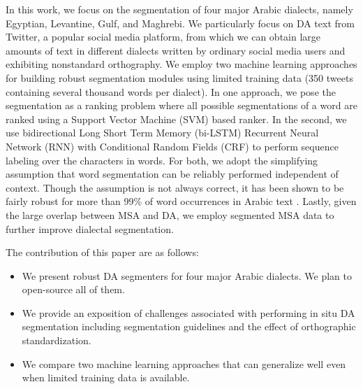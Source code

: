\documentclass[11pt,letterpaper]{article}
\begin{document}
In this work, we focus on the segmentation of four major Arabic dialects, namely Egyptian, Levantine, Gulf, and Maghrebi.  We particularly focus on DA text from Twitter, a popular social media platform, from which we can obtain large amounts of text in different dialects written by ordinary social media users and exhibiting nonstandard orthography. We employ two machine learning approaches for building robust segmentation modules using limited training data (350 tweets containing several thousand words per dialect).  In one approach, we pose the segmentation as a ranking problem where all possible segmentations of a word are ranked using a Support Vector Machine (SVM) based ranker. In the second, we use bidirectional Long Short Term Memory (bi-LSTM) Recurrent Neural Network (RNN) with Conditional Random Fields (CRF) to perform sequence labeling over the characters in words.  For both, we adopt the simplifying assumption that word segmentation can be reliably performed independent of context.  Though the assumption is not always correct, it has been shown to be fairly robust for more than 99\% of word occurrences in Arabic text \cite{abdelali2016farasa}.  Lastly, given the large overlap between MSA and DA, we employ segmented MSA data to further improve dialectal segmentation.

The contribution of this paper are as follows:
\begin{itemize}[leftmargin=*]
\setlength\itemsep{-0.3em}
\item We present robust DA segmenters for four major Arabic dialects.  We plan to open-source all of them.
\item We provide an exposition of challenges associated with performing in situ DA segmentation including segmentation guidelines and the effect of orthographic standardization. 
\item We compare two machine learning approaches that can generalize well even when limited training data is available.
\end{itemize}
\end{document}
